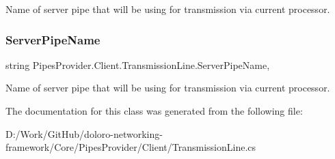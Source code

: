 Name of server pipe that will be using for transmission via current processor. 

\mbox{\label{class_pipes_provider_1_1_client_1_1_transmission_line_aa7e8a85952e05718b1a0ff96b9874766}} 
\subsubsection{\texorpdfstring{Server\+Pipe\+Name}{ServerPipeName}}
{\footnotesize\ttfamily string Pipes\+Provider.\+Client.\+Transmission\+Line.\+Server\+Pipe\+Name\hspace{0.3cm}{\ttfamily [get]}, {}}



Name of server pipe that will be using for transmission via current processor. 



The documentation for this class was generated from the following file\+:\begin{DoxyCompactItemize}
\item 
D\+:/\+Work/\+Git\+Hub/doloro-\/networking-\/framework/\+Core/\+Pipes\+Provider/\+Client/Transmission\+Line.\+cs\end{DoxyCompactItemize}
